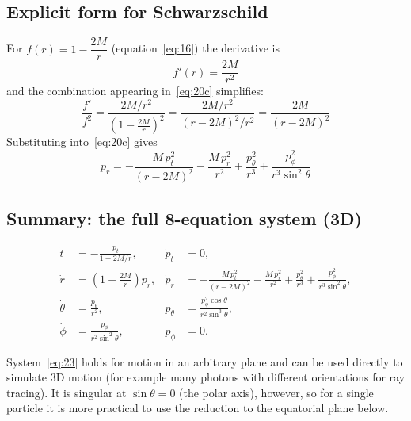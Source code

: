 \documentclass[11pt,a4paper]{article}
\begin{document}
\subsection{Explicit form for Schwarzschild}

For $f(r) = 1 - \dfrac{2M}{r}$ (equation~\eqref{eq:16}) the derivative is
\begin{equation*}
f'(r) = \frac{2M}{r^2} \tag{21}\label{eq:21}
\end{equation*}
and the combination appearing in~\eqref{eq:20c} simplifies:
\begin{equation*}
\frac{f'}{f^2} = \frac{2M/r^2}{\left(1 - \frac{2M}{r}\right)^2} = \frac{2M/r^2}{(r - 2M)^2 / r^2} = \frac{2M}{(r - 2M)^2}
\end{equation*}
Substituting into~\eqref{eq:20c} gives
\begin{equation*}
\dot{p}_r = -\frac{M\, p_t^2}{(r - 2M)^2} - \frac{M\, p_r^2}{r^2} + \frac{p_\theta^2}{r^3} + \frac{p_\phi^2}{r^3 \sin^2\theta} \tag{22}\label{eq:22}
\end{equation*}

\subsection{Summary: the full 8-equation system (3D)}

\begin{equation*}
\begin{aligned}
    \dot{t} &= -\frac{p_t}{1 - 2M/r}, &
    \dot{p}_t &= 0, \\[4pt]
    \dot{r} &= \left(1 - \frac{2M}{r}\right) p_r, &
    \dot{p}_r &= -\frac{M\, p_t^2}{(r - 2M)^2} - \frac{M\, p_r^2}{r^2} + \frac{p_\theta^2}{r^3} + \frac{p_\phi^2}{r^3 \sin^2\theta}, \\[4pt]
    \dot{\theta} &= \frac{p_\theta}{r^2}, &
    \dot{p}_\theta &= \frac{p_\phi^2 \cos\theta}{r^2 \sin^3\theta}, \\[4pt]
    \dot{\phi} &= \frac{p_\phi}{r^2 \sin^2\theta}, &
    \dot{p}_\phi &= 0.
\end{aligned} \tag{23}\label{eq:23}
\end{equation*}

System~\eqref{eq:23} holds for motion in an arbitrary plane and can be used directly to simulate 3D motion (for example many photons with different orientations for ray tracing). It is singular at $\sin\theta = 0$ (the polar axis), however, so for a single particle it is more practical to use the reduction to the equatorial plane below.
\end{document}
